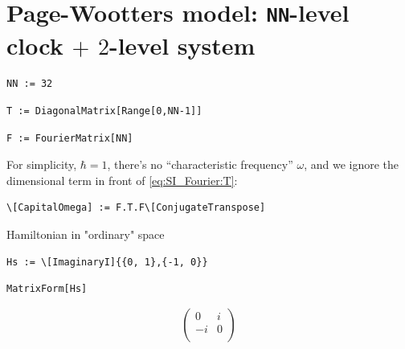 \section{Page-Wootters model: \texttt{NN}-level clock $+$ $2$-level system}

\begin{lstlisting}
NN := 32
\end{lstlisting}

\begin{lstlisting}
T := DiagonalMatrix[Range[0,NN-1]]
\end{lstlisting}

\begin{lstlisting}
F := FourierMatrix[NN]
\end{lstlisting}

For simplicity, $\hbar = 1$, there's no ``characteristic frequency'' $\omega$,
and we ignore the dimensional term in front of \eqref{eq:SI_Fourier:T}:

\begin{lstlisting}
\[CapitalOmega] := F.T.F\[ConjugateTranspose] 
\end{lstlisting}

Hamiltonian in "ordinary" space
\begin{lstlisting}
Hs := \[ImaginaryI]{{0, 1},{-1, 0}}
\end{lstlisting}
\begin{lstlisting}
MatrixForm[Hs]
\end{lstlisting}
\[
  \left(
    \begin{array}{cc}
     0 & i \\
     -i & 0 \\
    \end{array}
    \right)
\]

